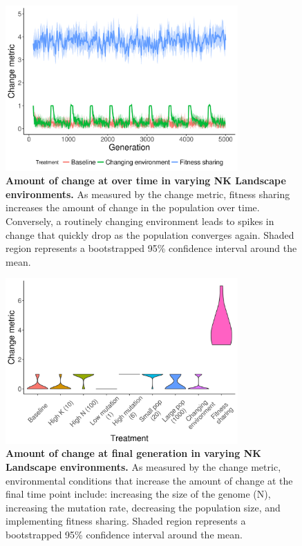 \documentclass[letterpaper]{article}
\begin{document}
\begin{figure}
\includegraphics[width=3.5in]{figs/change_changing_environments.png}
\caption{\textbf{Amount of change at over time in varying NK Landscape environments.} As measured by the change metric, fitness sharing increases the amount of change in the population over time. Conversely, a routinely changing environment leads to spikes in change that quickly drop as the population converges again. Shaded region represents a bootstrapped 95\% confidence interval around the mean.}
\label{change_time}
\end{figure}

\begin{figure}
\includegraphics[width=3.5in]{figs/changeboxplots.png}
\caption{\textbf{Amount of change at final generation in varying NK Landscape environments.} As measured by the change metric, environmental conditions that increase the amount of change at the final time point include: increasing the size of the genome (N), increasing the mutation rate, decreasing the population size, and implementing fitness sharing. Shaded region represents a bootstrapped 95\% confidence interval around the mean.}
\label{change}
\end{figure}
\end{document}

